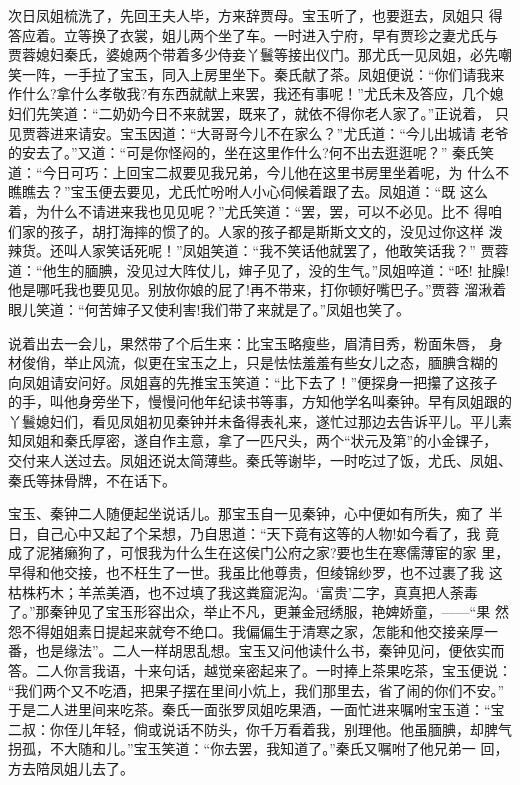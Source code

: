 次日凤姐梳洗了，先回王夫人毕，方来辞贾母。宝玉听了，也要逛去，凤姐只
得答应着。立等换了衣裳，姐儿两个坐了车。一时进入宁府，早有贾珍之妻尤氏与
贾蓉媳妇秦氏，婆媳两个带着多少侍妾丫鬟等接出仪门。那尤氏一见凤姐，必先嘲
笑一阵，一手拉了宝玉，同入上房里坐下。秦氏献了茶。凤姐便说：“你们请我来
作什么?拿什么孝敬我?有东西就献上来罢，我还有事呢！”尤氏未及答应，几个媳
妇们先笑道：“二奶奶今日不来就罢，既来了，就依不得你老人家了。”正说着，
只见贾蓉进来请安。宝玉因道：“大哥哥今儿不在家么？”尤氏道：“今儿出城请
老爷的安去了。”又道：“可是你怪闷的，坐在这里作什么?何不出去逛逛呢？”
秦氏笑道：“今日可巧：上回宝二叔要见我兄弟，今儿他在这里书房里坐着呢，为
什么不瞧瞧去？”宝玉便去要见，尤氏忙吩咐人小心伺候着跟了去。凤姐道：“既
这么着，为什么不请进来我也见见呢？”尤氏笑道：“罢，罢，可以不必见。比不
得咱们家的孩子，胡打海摔的惯了的。人家的孩子都是斯斯文文的，没见过你这样
泼辣货。还叫人家笑话死呢！”凤姐笑道：“我不笑话他就罢了，他敢笑话我？”
贾蓉道：“他生的腼腆，没见过大阵仗儿，婶子见了，没的生气。”凤姐啐道：“呸!
扯臊!他是哪吒我也要见见。别放你娘的屁了!再不带来，打你顿好嘴巴子。”贾蓉
溜湫着眼儿笑道：“何苦婶子又使利害!我们带了来就是了。”凤姐也笑了。

说着出去一会儿，果然带了个后生来：比宝玉略瘦些，眉清目秀，粉面朱唇，
身材俊俏，举止风流，似更在宝玉之上，只是怯怯羞羞有些女儿之态，腼腆含糊的
向凤姐请安问好。凤姐喜的先推宝玉笑道：“比下去了！”便探身一把攥了这孩子
的手，叫他身旁坐下，慢慢问他年纪读书等事，方知他学名叫秦钟。早有凤姐跟的
丫鬟媳妇们，看见凤姐初见秦钟并未备得表礼来，遂忙过那边去告诉平儿。平儿素
知凤姐和秦氏厚密，遂自作主意，拿了一匹尺头，两个“状元及第”的小金锞子，
交付来人送过去。凤姐还说太简薄些。秦氏等谢毕，一时吃过了饭，尤氏、凤姐、
秦氏等抹骨牌，不在话下。

宝玉、秦钟二人随便起坐说话儿。那宝玉自一见秦钟，心中便如有所失，痴了
半日，自己心中又起了个呆想，乃自思道：“天下竟有这等的人物!如今看了，我
竟成了泥猪癞狗了，可恨我为什么生在这侯门公府之家?要也生在寒儒薄宦的家
里，早得和他交接，也不枉生了一世。我虽比他尊贵，但绫锦纱罗，也不过裹了我
这枯株朽木；羊羔美酒，也不过填了我这粪窟泥沟。‘富贵’二字，真真把人荼毒
了。”那秦钟见了宝玉形容出众，举止不凡，更兼金冠绣服，艳婢娇童，——“果
然怨不得姐姐素日提起来就夸不绝口。我偏偏生于清寒之家，怎能和他交接亲厚一
番，也是缘法”。二人一样胡思乱想。宝玉又问他读什么书，秦钟见问，便依实而
答。二人你言我语，十来句话，越觉亲密起来了。一时捧上茶果吃茶，宝玉便说：
“我们两个又不吃酒，把果子摆在里间小炕上，我们那里去，省了闹的你们不安。”
于是二人进里间来吃茶。秦氏一面张罗凤姐吃果酒，一面忙进来嘱咐宝玉道：“宝
二叔：你侄儿年轻，倘或说话不防头，你千万看着我，别理他。他虽腼腆，却脾气
拐孤，不大随和儿。”宝玉笑道：“你去罢，我知道了。”秦氏又嘱咐了他兄弟一
回，方去陪凤姐儿去了。

